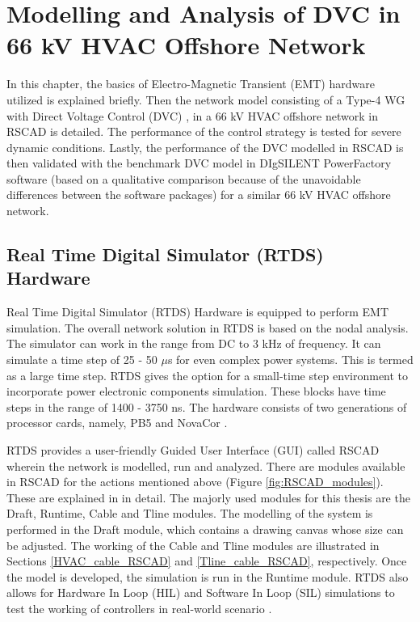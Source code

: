 \chapter{Modelling and Analysis of DVC in 66 kV HVAC Offshore Network}\label{3}

In this chapter, the basics of Electro-Magnetic Transient (\gls{EMT}) hardware utilized is explained briefly. Then the network model consisting of a Type-4 \gls{WG} with Direct Voltage Control (\gls{DVC}) \cite{korai_dynamic_2019}, \cite{sethi_real-time_nodate-new} in a 66 kV \gls{HVAC} offshore network in RSCAD is detailed. The performance of the control strategy is tested for severe dynamic conditions. Lastly, the performance of the \gls{DVC} modelled in RSCAD is then validated with the benchmark \gls{DVC} model in DIgSILENT PowerFactory software \cite{korai_98_nodate} (based on a qualitative comparison because of the unavoidable differences between the software packages) for a similar 66 kV \gls{HVAC} offshore network.

\section{Real Time Digital Simulator (RTDS) Hardware}\label{RTDS_Theory}
Real Time Digital Simulator (RTDS) Hardware is equipped to perform \gls{EMT} simulation. The overall network solution in RTDS is based on the nodal analysis. The simulator can work in the range from DC to 3 kHz of frequency. It can simulate a time step of 25 - 50 $\mu$s for even complex power systems. This is termed as a large time step. RTDS gives the option for a small-time step environment to incorporate power electronic components simulation. These blocks have time steps in the range of 1400  - 3750 ns. The hardware consists of two generations of processor cards, namely, PB5 and NovaCor \cite{rtds_tech}.  

RTDS provides a user-friendly Guided User Interface (GUI) called RSCAD wherein the network is modelled, run and analyzed. There are modules available in RSCAD for the actions mentioned above (Figure \ref{fig:RSCAD_modules}). These are explained in \cite{rtds_tech} in detail. The majorly used modules for this thesis are the Draft, Runtime, Cable and Tline modules. The modelling of the system is performed in the Draft module, which contains a drawing canvas whose size can be adjusted. The working of the Cable and Tline modules are illustrated in Sections \ref{HVAC_cable_RSCAD} and \ref{Tline_cable_RSCAD}, respectively. Once the model is developed, the simulation is run in the Runtime module. RTDS also allows for Hardware In Loop (HIL) and Software In Loop (SIL) simulations to test the working of controllers in real-world scenario \cite{rtds_tech_hardware}.

